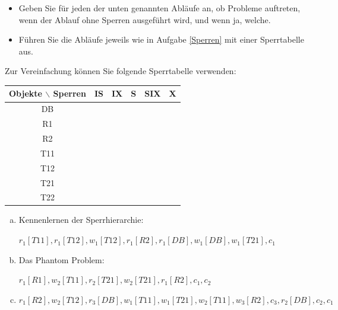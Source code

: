 \begin{normalText}
\begin{itemize}
	\item Geben Sie für jeden der unten genannten Abläufe an, ob Probleme auftreten, wenn der Ablauf ohne Sperren ausgeführt wird, und wenn ja, welche.
	\item Führen Sie die Abläufe jeweils wie in Aufgabe \ref{Sperren} mit einer Sperrtabelle aus.
\end{itemize}
Zur Vereinfachung können Sie folgende Sperrtabelle verwenden:

\begin{tabular}{|c|c|c|c|c|c|}
	\hline
	Objekte $\backslash$ Sperren & IS & IX & S & SIX & X \\ \hline
	             DB              &    &    &   &     &   \\ \hline
	             R1              &    &    &   &     &   \\ \hline
	             R2              &    &    &   &     &   \\ \hline
	            T11              &    &    &   &     &   \\ \hline
	            T12              &    &    &   &     &   \\ \hline
	            T21              &    &    &   &     &   \\ \hline
	            T22              &    &    &   &     &   \\ \hline
\end{tabular}

\begin{enumerate}[a)]
	\item
	\begin{note}
		Kennenlernen der Sperrhierarchie:
	\end{note}
	$r_1[T11], r_1[T12], w_1[T12], r_1[R2], r_1[DB], w_1[DB], w_1[T21], c_1$
	\item
	\begin{note}
		Das Phantom Problem:
	\end{note}
	$r_1[R1], w_2[T11], r_2[T21], w_2[T21], r_1[R2], c_1, c_2$
	\item $r_1[R2], w_2[T12], r_3[DB], w_1[T11], w_1[T21], w_2[T11], w_3[R2], c_3, r_2[DB], c_2, c_1$
\end{enumerate}
\end{normalText}

